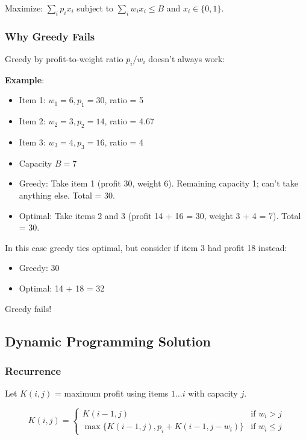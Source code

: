 \documentclass[11pt]{article}
\begin{document}
{{{Maximize: $\sum_i p_i x_i$ subject to $\sum_i w_i x_i \le B$ and $x_i \in \{0, 1\}$.

\subsubsection*{Why Greedy Fails}
Greedy by profit-to-weight ratio $p_i / w_i$ doesn't always work:

\textbf{Example}:
\begin{itemize}
\item Item 1: $w_1 = 6, p_1 = 30$, ratio = 5
\item Item 2: $w_2 = 3, p_2 = 14$, ratio = 4.67
\item Item 3: $w_3 = 4, p_3 = 16$, ratio = 4
\item Capacity $B = 7$
\end{itemize}

\begin{itemize}
\item Greedy: Take item 1 (profit 30, weight 6). Remaining capacity 1; can't take anything else. Total = 30.
\item Optimal: Take items 2 and 3 (profit 14 + 16 = 30, weight 3 + 4 = 7). Total = 30.
\end{itemize}

In this case greedy ties optimal, but consider if item 3 had profit 18 instead:
\begin{itemize}
\item Greedy: 30
\item Optimal: 14 + 18 = 32
\end{itemize}

Greedy fails!

\subsection*{Dynamic Programming Solution}

\subsubsection*{Recurrence}
Let $K(i, j)$ = maximum profit using items $1 \ldots i$ with capacity $j$.

\[
K(i, j) = \begin{cases}
K(i-1, j) & \text{if } w_i > j \\
\max\{K(i-1, j), p_i + K(i-1, j-w_i)\} & \text{if } w_i \le j
\end{cases}
\]

}}}
\end{document}
